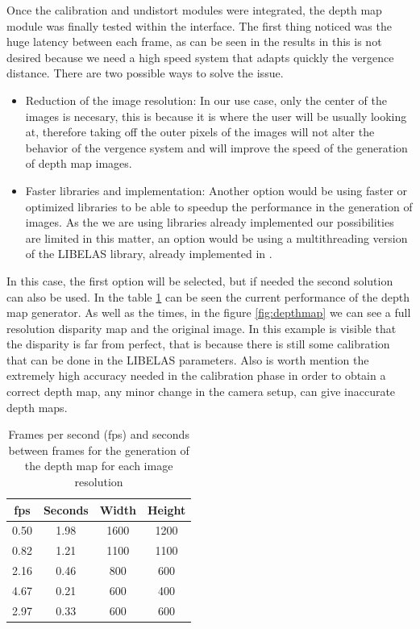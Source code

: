 \documentclass[10pt,a4paper,twocolumn,twoside]{article}
\begin{document}
	Once the calibration and undistort modules were integrated, the depth map module was finally tested within the interface. 
	The first thing noticed was the huge latency between each frame, as can be seen in the results in  this is not desired because we need a high speed system that adapts quickly the vergence distance. There are two possible ways to solve the issue.
	
	\begin{itemize}
		\item Reduction of the image resolution: In our use case, only the center of the images is necesary, this is because it is where the user will be usually looking at, therefore taking off the outer pixels of the images will not alter the behavior of the vergence system and will improve the speed of the generation of depth map images.
		
		\item Faster libraries and implementation: Another option would be using faster or optimized libraries to be able to speedup the performance in the generation of images. As the we are using libraries already implemented our possibilities are limited in this matter, an option would be using a multithreading version of the LIBELAS library, already implemented in \cite{web:LIBELAS}.
	\end{itemize}
	In this case, the first option will be selected, but if needed the second solution can also be used. In the table \ref{tab:depthmap} can be seen the current performance of the depth map generator. As well as the times, in the figure \ref{fig:depthmap} we can see a full resolution disparity map and the original image. In this example is visible that the disparity is far from perfect, that is because there is still some calibration that can be done in the LIBELAS parameters. Also is worth mention the extremely high accuracy needed in the calibration phase in order to obtain a correct depth map, any minor change in the camera setup, can give inaccurate depth maps.

	\begin{table}
		\begin{center}
			\begin{tabular}{cccc}
				\toprule
				fps & Seconds & Width & Height \\ 
				\midrule
				0.50 & 1.98 & 1600 & 1200 \\ 
		
				0.82 & 1.21 & 1100 & 1100 \\ 
		
				2.16 & 0.46 & 800 & 600 \\ 
		
				4.67 & 0.21 & 600 & 400 \\ 
		
				2.97 & 0.33 & 600 & 600 \\ 
				\bottomrule
				
			\end{tabular} 
			\caption{Frames per second (fps) and seconds between frames for the generation of the depth map for each image resolution }
			\label{tab:depthmap}
		\end{center}
	\end{table}
\end{document}
